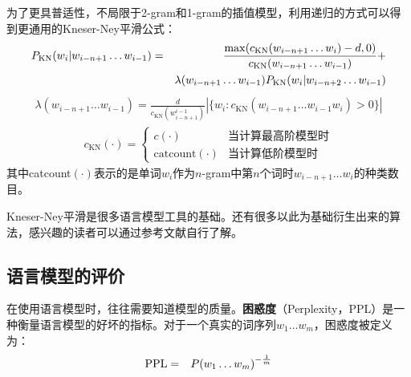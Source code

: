 \parinterval 为了更具普适性，不局限于2-gram和1-gram的插值模型，利用递归的方式可以得到更通用的Kneser-Ney平滑公式：
\begin{eqnarray}
{P}_{\textrm{KN}}(w_i|w_{i-n+1}  \ldots w_{i-1}) & = & \frac{\max(c_{\textrm{KN}}(w_{i-n+1} \ldots w_{i})-d,0)}{c_{\textrm{KN}}(w_{i-n+1} \ldots w_{i-1})} + \nonumber \\
                                                   &   &  \lambda(w_{i-n+1} \ldots w_{i-1}){P}_{\textrm{KN}}(w_i|w_{i-n+2} \ldots w_{i-1})
\label{eq:2-39}
\end{eqnarray}
\begin{eqnarray}
\lambda(w_{i-n+1} \ldots w_{i-1}) =  \frac{d}{c_{\textrm{KN}}(w_{i-n+1}^{i-1})}|\{w_i:c_{\textrm{KN}}(w_{i-n+1} \ldots w_{i-1} w_i)>0\}|
\label{eq:2-40}
\end{eqnarray}
\begin{eqnarray}
c_{\textrm{KN}}(\cdot) = \left\{\begin{array}{ll}
c(\cdot) & \textrm{当计算最高阶模型时}  \\
\textrm{catcount}(\cdot) & \textrm{当计算低阶模型时}
\end{array}\right.
\label{eq:2-41}
\end{eqnarray}
\noindent 其中catcount$(\cdot)$表示的是单词$w_i$作为$n$-gram中第$n$个词时$w_{i-n+1} \ldots w_i$的种类数目。

\parinterval Kneser-Ney平滑是很多语言模型工具的基础。还有很多以此为基础衍生出来的算法，感兴趣的读者可以通过参考文献自行了解。


\subsection{语言模型的评价}

\parinterval  在使用语言模型时，往往需要知道模型的质量。{\small\sffamily\bfseries{困惑度}}（Perplexity，PPL）是一种衡量语言模型的好坏的指标。对于一个真实的词序列$ w_1\dots w_m $，困惑度被定义为：
\begin{eqnarray}
{\rm{PPL}}&=&{P}{(w_1\dots w_m)}^{- \frac{1}{m}}
\label{eq:5-65}
\end{eqnarray}

